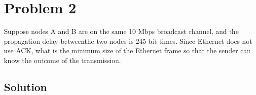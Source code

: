 
\section*{Problem 2}

Suppose nodes A and B are on the same 10 Mbps broadcast channel, and the propagation delay betweenthe two nodes is 245 bit times.
Since Ethernet does not use ACK, what is the minimum size of the Ethernet frame so that the sender can know the outcome of the transmission.

\subsection*{Solution}
